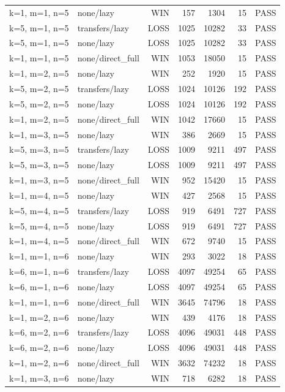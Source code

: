 \begin{longtable}{llrrrrl}
k=1, m=1, n=5 & none/lazy & WIN & 157 & 1304 & 15 & PASS \\
k=5, m=1, n=5 & transfers/lazy & LOSS & 1025 & 10282 & 33 & PASS \\
k=5, m=1, n=5 & none/lazy & LOSS & 1025 & 10282 & 33 & PASS \\
k=1, m=1, n=5 & none/direct\_full & WIN & 1053 & 18050 & 15 & PASS \\
k=1, m=2, n=5 & none/lazy & WIN & 252 & 1920 & 15 & PASS \\
k=5, m=2, n=5 & transfers/lazy & LOSS & 1024 & 10126 & 192 & PASS \\
k=5, m=2, n=5 & none/lazy & LOSS & 1024 & 10126 & 192 & PASS \\
k=1, m=2, n=5 & none/direct\_full & WIN & 1042 & 17660 & 15 & PASS \\
k=1, m=3, n=5 & none/lazy & WIN & 386 & 2669 & 15 & PASS \\
k=5, m=3, n=5 & transfers/lazy & LOSS & 1009 & 9211 & 497 & PASS \\
k=5, m=3, n=5 & none/lazy & LOSS & 1009 & 9211 & 497 & PASS \\
k=1, m=3, n=5 & none/direct\_full & WIN & 952 & 15420 & 15 & PASS \\
k=1, m=4, n=5 & none/lazy & WIN & 427 & 2568 & 15 & PASS \\
k=5, m=4, n=5 & transfers/lazy & LOSS & 919 & 6491 & 727 & PASS \\
k=5, m=4, n=5 & none/lazy & LOSS & 919 & 6491 & 727 & PASS \\
k=1, m=4, n=5 & none/direct\_full & WIN & 672 & 9740 & 15 & PASS \\
k=1, m=1, n=6 & none/lazy & WIN & 293 & 3022 & 18 & PASS \\
k=6, m=1, n=6 & transfers/lazy & LOSS & 4097 & 49254 & 65 & PASS \\
k=6, m=1, n=6 & none/lazy & LOSS & 4097 & 49254 & 65 & PASS \\
k=1, m=1, n=6 & none/direct\_full & WIN & 3645 & 74796 & 18 & PASS \\
k=1, m=2, n=6 & none/lazy & WIN & 439 & 4176 & 18 & PASS \\
k=6, m=2, n=6 & transfers/lazy & LOSS & 4096 & 49031 & 448 & PASS \\
k=6, m=2, n=6 & none/lazy & LOSS & 4096 & 49031 & 448 & PASS \\
k=1, m=2, n=6 & none/direct\_full & WIN & 3632 & 74232 & 18 & PASS \\
k=1, m=3, n=6 & none/lazy & WIN & 718 & 6282 & 18 & PASS \\

\end{longtable}
